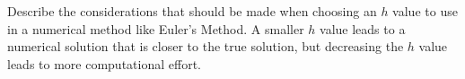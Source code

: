 {
Describe the considerations that should be made when choosing an $h$ value to use in a numerical method like Euler's Method.
}
{
A smaller $h$ value leads to a numerical solution that is closer to the true solution, but decreasing the $h$ value leads to more computational effort.
}